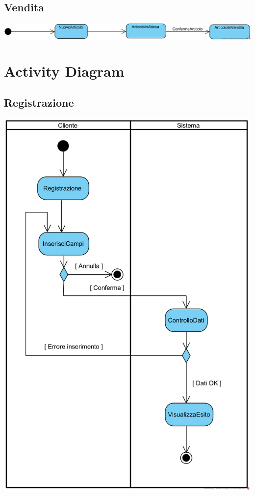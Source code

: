 \documentclass[12pt]{article}
\begin{document}
\subsection{Vendita}
\includegraphics[width=\textwidth]{StateChart/Vendita}

\newpage

\section{Activity Diagram}

\subsection{Registrazione}
\begin{center}
\includegraphics[width=\textwidth]{ActivityDiagram/ClienteRegistrazione}
\end{center}
\end{document}
